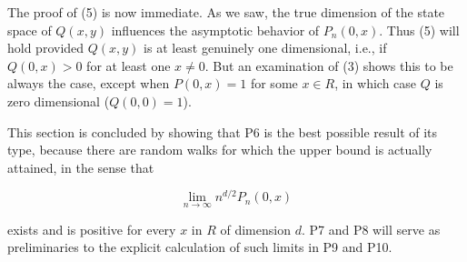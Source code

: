The proof of (5) is now immediate. As we saw, the true dimension of the state space of $Q(x,y)$ influences the asymptotic behavior of $P_n(0,x)$. Thus (5) will hold provided $Q(x,y)$ is at least genuinely one dimensional, i.e., if $Q(0,x) > 0$ for at least one $x \neq 0$. But an examination of (3) shows this to be always the case, except when $P(0,x) = 1$ for some $x \in R$, in which case $Q$ is zero dimensional ($Q(0,0) = 1$).

This section is concluded by showing that P6 is the best possible result of its type, because there are random walks for which the upper bound is actually attained, in the sense that

$$\lim_{n \to \infty} n^{d/2} P_n(0,x)$$

exists and is positive for every $x$ in $R$ of dimension $d$. P7 and P8 will serve as preliminaries to the explicit calculation of such limits in P9 and P10.